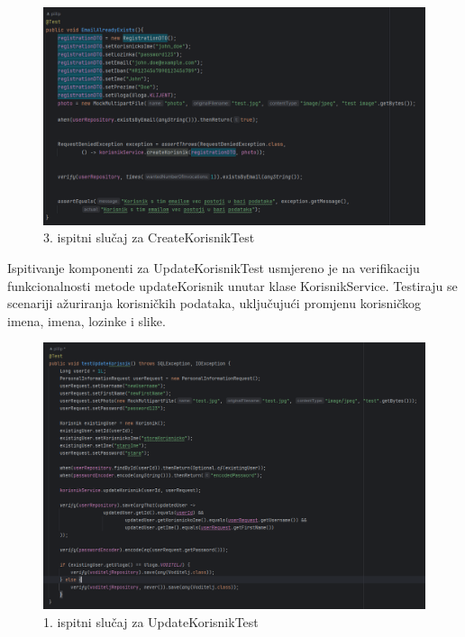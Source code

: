 \begin{figure}[H]
	\includegraphics[width=\textwidth]{slike/email.png} %
	\centering
	\caption{3. ispitni slučaj za CreateKorisnikTest}
	\label{fig:dijagramstanja}
\end{figure}

Ispitivanje komponenti za UpdateKorisnikTest usmjereno je na verifikaciju funkcionalnosti metode updateKorisnik unutar klase KorisnikService. Testiraju se scenariji ažuriranja korisničkih podataka, uključujući promjenu korisničkog imena, imena, lozinke i slike.

\begin{figure}[H]
	\includegraphics[width=\textwidth]{slike/testupdatekorisnik.png} %
	\centering
	\caption{1. ispitni slučaj za UpdateKorisnikTest}
	\label{fig:dijagramstanja}
\end{figure}


